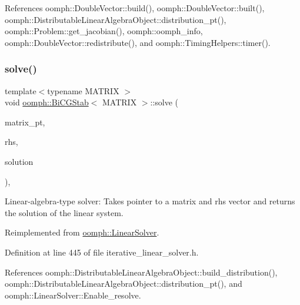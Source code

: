 References oomph\+::\+Double\+Vector\+::build(), oomph\+::\+Double\+Vector\+::built(), oomph\+::\+Distributable\+Linear\+Algebra\+Object\+::distribution\+\_\+pt(), oomph\+::\+Problem\+::get\+\_\+jacobian(), oomph\+::oomph\+\_\+info, oomph\+::\+Double\+Vector\+::redistribute(), and oomph\+::\+Timing\+Helpers\+::timer().

\mbox{\label{classoomph_1_1BiCGStab_ae37a1ed41c1c12bfba516e27254ed03c}} 
\subsubsection{\texorpdfstring{solve()}{solve()}\hspace{0.1cm}{\footnotesize\ttfamily [2/3]}}
{\footnotesize\ttfamily template$<$typename M\+A\+T\+R\+IX $>$ \\
void \hyperlink{classoomph_1_1BiCGStab}{oomph\+::\+Bi\+C\+G\+Stab}$<$ M\+A\+T\+R\+IX $>$\+::solve (\begin{DoxyParamCaption}\item[{\hyperlink{classoomph_1_1DoubleMatrixBase}{Double\+Matrix\+Base} $\ast$const \&}]{matrix\+\_\+pt,  }\item[{const \hyperlink{classoomph_1_1DoubleVector}{Double\+Vector} \&}]{rhs,  }\item[{\hyperlink{classoomph_1_1DoubleVector}{Double\+Vector} \&}]{solution }\end{DoxyParamCaption})\hspace{0.3cm}{\ttfamily [inline]}, {\ttfamily [virtual]}}



Linear-\/algebra-\/type solver\+: Takes pointer to a matrix and rhs vector and returns the solution of the linear system. 



Reimplemented from \hyperlink{classoomph_1_1LinearSolver_a546c09822d18191df14caed864c04c09}{oomph\+::\+Linear\+Solver}.



Definition at line 445 of file iterative\+\_\+linear\+\_\+solver.\+h.



References oomph\+::\+Distributable\+Linear\+Algebra\+Object\+::build\+\_\+distribution(), oomph\+::\+Distributable\+Linear\+Algebra\+Object\+::distribution\+\_\+pt(), and oomph\+::\+Linear\+Solver\+::\+Enable\+\_\+resolve.

